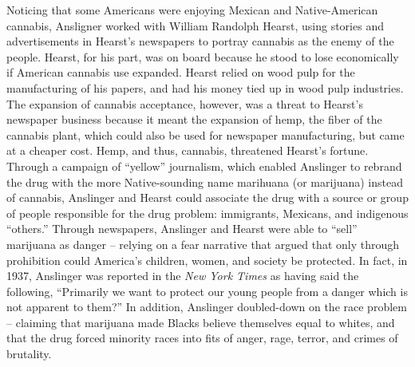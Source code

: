 Noticing that some Americans were enjoying Mexican and Native-American cannabis, Ansligner worked with William Randolph Hearst, using stories and advertisements in Hearst's newspapers to portray cannabis as the enemy of the people. Hearst, for his part, was on board because he stood to lose economically if American cannabis use expanded. Hearst relied on wood pulp for the manufacturing of his papers, and had his money tied up in wood pulp industries. The expansion of cannabis acceptance, however, was a threat to Hearst's newspaper business because it meant the expansion of hemp, the fiber of the cannabis plant, which could also be used for newspaper manufacturing, but came at a cheaper cost. Hemp, and thus, cannabis, threatened Hearst's fortune. Through a campaign of ``yellow'' journalism, which enabled Anslinger to rebrand the drug with the more Native-sounding name marihuana (or marijuana) instead of cannabis, Anslinger and Hearst could associate the drug with a source or group of people responsible for the drug problem: immigrants, Mexicans, and indigenous ``others.'' Through newspapers, Anslinger and Hearst were able to ``sell'' marijuana as danger -- relying on a fear narrative that argued that only through prohibition could America's children, women, and society be protected. In fact, in 1937, Anslinger was reported in the  \textit{New York Times} as having said the following, ``Primarily we want to protect our young people from a danger which is not apparent to them?''  In addition, Anslinger doubled-down on the race problem -- claiming that marijuana made Blacks believe themselves equal to whites, and that the drug forced minority races into fits of anger, rage, terror, and crimes of brutality. 

